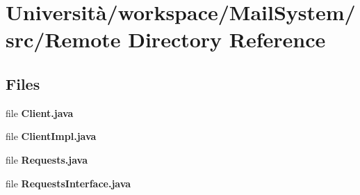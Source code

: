 \section{Università/workspace/\+Mail\+System/src/\+Remote Directory Reference}
\label{dir_a993f077bee07d9531046da0f611fa1e}
\subsection*{Files}
\begin{DoxyCompactItemize}
\item 
file \textbf{ Client.\+java}
\item 
file \textbf{ Client\+Impl.\+java}
\item 
file \textbf{ Requests.\+java}
\item 
file \textbf{ Requests\+Interface.\+java}
\end{DoxyCompactItemize}
